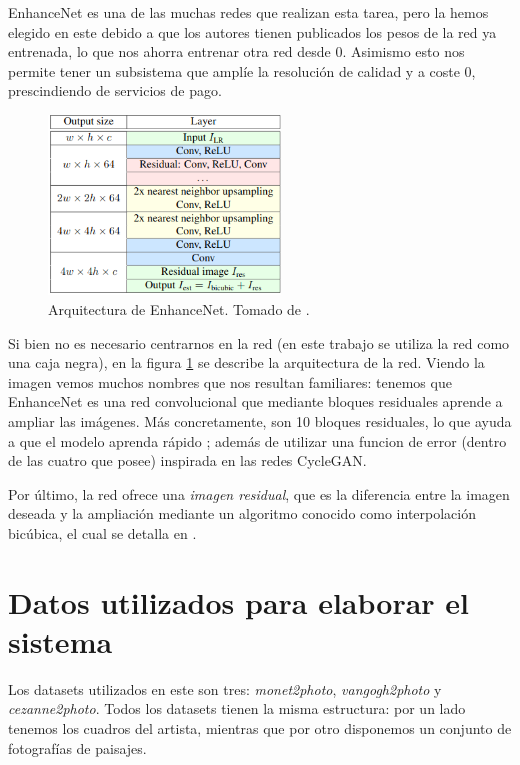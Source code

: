 \documentclass[../main.tex]{subfiles}
\begin{document}
EnhanceNet es una de las muchas redes que realizan esta tarea, pero la hemos elegido en este \tfg debido a que los autores tienen publicados los pesos de la red ya entrenada, lo que nos ahorra entrenar otra red desde 0. Asimismo esto nos permite tener un subsistema que amplíe la resolución de calidad y a coste 0, prescindiendo de servicios de pago. \newline

\begin{figure}[h]
    \centering
    \includegraphics[width=0.55\textwidth]{imagenes/arquitectura_enhancenet.png}
    \caption[Arquitectura de EnhanceNet]{Arquitectura de EnhanceNet. Tomado de \cite{Sajjadi2016}.}
    \label{fig:arquitectura_enhancenet}
\end{figure}

Si bien no es necesario centrarnos en la red (en este trabajo se utiliza la red como una caja negra), en la figura \ref{fig:arquitectura_enhancenet} se describe la arquitectura de la red. Viendo la imagen vemos muchos nombres que nos resultan familiares: tenemos que EnhanceNet es una red convolucional que mediante bloques residuales aprende a ampliar las imágenes. Más concretamente, son 10 bloques residuales, lo que ayuda a que el modelo aprenda rápido \cite{Rapole2020}; además de utilizar una funcion de error (dentro de las cuatro que posee) inspirada en las redes CycleGAN. \newline

Por último, la red ofrece una \textit{imagen residual}, que es la diferencia entre la imagen deseada y la ampliación mediante un algoritmo conocido como interpolación bicúbica, el cual se detalla en \cite{Tabora2020}.

\section{Datos utilizados para elaborar el sistema}

Los datasets utilizados en este \tfg son tres: \textit{monet2photo}, \textit{vangogh2photo} y \textit{cezanne2photo}. Todos los datasets tienen la misma estructura: por un lado tenemos los cuadros del artista, mientras que por otro disponemos un conjunto de fotografías de paisajes. \newline
\end{document}
